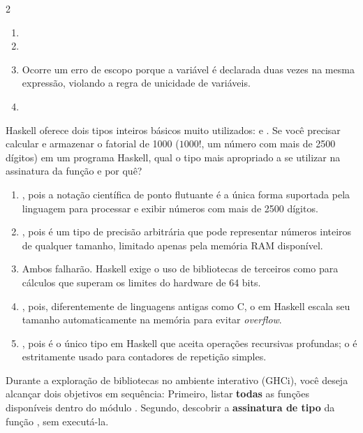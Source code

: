 \documentclass[a4paper,10pt,brazil]{article}
\begin{document}
\begin{multicols}{2}
\begin{enumerate}
  \item {}

  \item {}

  \item Ocorre um erro de escopo porque a variável  é declarada duas vezes na mesma expressão, violando a regra de unicidade de variáveis.

  \item {}


\end{enumerate}

Haskell oferece dois tipos inteiros básicos muito utilizados:  e . Se você precisar calcular e armazenar o fatorial de 1000 ($1000!$, um número com mais de 2500 dígitos) em um programa Haskell, qual o tipo mais apropriado a se utilizar na assinatura da função e por quê?

\begin{enumerate}
  \item {}, pois a notação científica de ponto flutuante é a única forma suportada pela linguagem para processar e exibir números com mais de 2500 dígitos.

  \item {}, pois é um tipo de precisão arbitrária que pode representar números inteiros de qualquer tamanho, limitado apenas pela memória RAM disponível.

  \item Ambos falharão. Haskell exige o uso de bibliotecas de terceiros como  para cálculos que superam os limites do hardware de 64 bits.

  \item {}, pois, diferentemente de linguagens antigas como C, o  em Haskell escala seu tamanho automaticamente na memória para evitar \emph{overflow}.

  \item {}, pois é o único tipo em Haskell que aceita operações recursivas profundas; o  é estritamente usado para contadores de repetição simples.


\end{enumerate}

Durante a exploração de bibliotecas no ambiente interativo (GHCi), você deseja alcançar dois objetivos em sequência:
Primeiro, listar \textbf{todas} as funções disponíveis dentro do módulo .
Segundo, descobrir a \textbf{assinatura de tipo} da função , sem executá-la.


\end{multicols}
\end{document}
